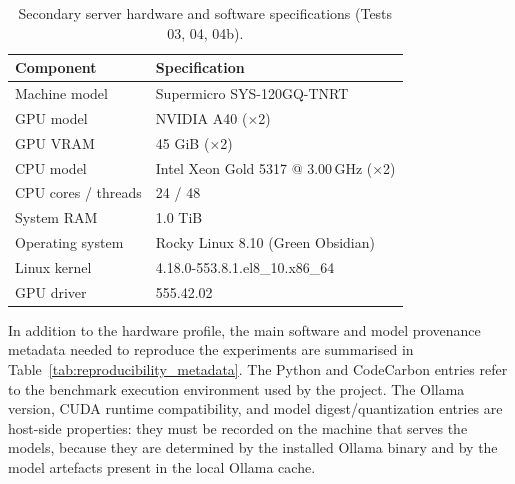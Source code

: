\begin{table}[H]
\centering
{}
\begin{tabular}{|l|l|}
\hline
\rowcolor{bluePoli!30}
\textbf{Component} & \textbf{Specification} \T\B \\
\hline
Machine model    & Supermicro SYS-120GQ-TNRT \T\B \\
\hline
GPU model        & NVIDIA A40 (×2) \T\B \\
\hline
GPU VRAM         & 45 GiB (×2) \T\B \\
\hline
CPU model        & Intel Xeon Gold 5317 @ 3.00\,GHz (×2) \T\B \\
\hline
CPU cores / threads & 24 / 48 \T\B \\
\hline
System RAM       & 1.0 TiB \T\B \\
\hline
Operating system & Rocky Linux 8.10 (Green Obsidian) \T\B \\
\hline
Linux kernel     & 4.18.0-553.8.1.el8\_10.x86\_64 \T\B \\
\hline
GPU driver       & 555.42.02 \T\B \\
\hline
\end{tabular}
\caption{Secondary server hardware and software specifications (Tests 03, 04, 04b).}
\label{tab:server_local}
\end{table}

In addition to the hardware profile, the main software and model provenance
metadata needed to reproduce the experiments are summarised in
Table~\ref{tab:reproducibility_metadata}. The Python and CodeCarbon entries
refer to the benchmark execution environment used by the project. The Ollama
version, CUDA runtime compatibility, and model digest/quantization entries are
host-side properties: they must be recorded on the machine that serves the
models, because they are determined by the installed Ollama binary and by the
model artefacts present in the local Ollama cache.

